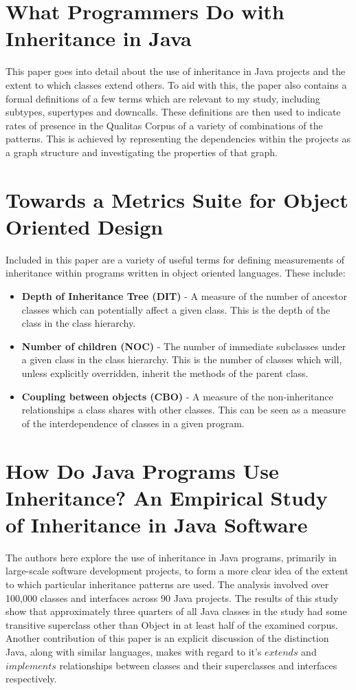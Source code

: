 \section{What Programmers Do with Inheritance in Java~\cite{InheritanceInJava}}
This paper goes into detail about the use of inheritance in Java projects and the extent to which classes extend others. To aid with this, the paper also contains a formal definitions of a few terms which are relevant to my study, including subtypes, supertypes and downcalls. These definitions are then used to indicate rates of presence in the Qualitas Corpus of a variety of combinations of the patterns. This is achieved by representing the dependencies within the projects as a graph structure and investigating the properties of that graph.

\section{Towards a Metrics Suite for Object Oriented Design~\cite{MetricsSuite}}
Included in this paper are a variety of useful terms for defining measurements of inheritance within programs written in object oriented languages. These include:
\begin{itemize}
	\item \textbf{Depth of Inheritance Tree (DIT)} - A measure of the number of ancestor classes which can potentially affect a given class. This is the depth of the class in the class hierarchy.
	\item \textbf{Number of children (NOC)} - The number of immediate subclasses under a given class in the class hierarchy. This is the number of classes which will, unless explicitly overridden, inherit the methods of the parent class.
	\item \textbf{Coupling between objects (CBO)} - A measure of the non-inheritance relationships a class shares with other classes. This can be seen as a measure of the interdependence of classes in a given program.
\end{itemize}

\section{How Do Java Programs Use Inheritance? An Empirical Study of Inheritance in Java Software~\cite{HowProgramsUseInheritance}}
The authors here explore the use of inheritance in Java programs, primarily in large-scale software development projects, to form a more clear idea of the extent to which particular inheritance patterns are used. The analysis involved over 100,000 classes and interfaces across 90 Java projects. The results of this study show that approximately three quarters of all Java classes in the study had some transitive superclass other than Object in at least half of the examined corpus. \newline
Another contribution of this paper is an explicit discussion of the distinction Java, along with similar languages, makes with regard to it's $extends$ and $implements$ relationships between classes and their superclasses and interfaces respectively.
